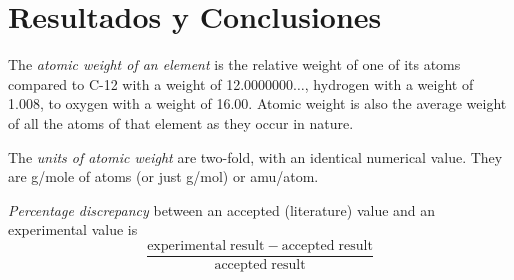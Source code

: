 \documentclass{article}
\begin{document}
\section{Resultados y Conclusiones}
\begin{enumerate}
\begin{item}
The \emph{atomic weight of an element} is the relative weight of one of its atoms compared to C-12 with a weight of 12.0000000$\ldots$, hydrogen with a weight of 1.008, to oxygen with a weight of 16.00. Atomic weight is also the average weight of all the atoms of that element as they occur in nature.
\end{item}
\begin{item}
The \emph{units of atomic weight} are two-fold, with an identical numerical value. They are g/mole of atoms (or just g/mol) or amu/atom.
\end{item}
\begin{item}
\emph{Percentage discrepancy} between an accepted (literature) value and an experimental value is
\begin{equation*}
\frac{\mathrm{experimental\;result} - \mathrm{accepted\;result}}{\mathrm{accepted\;result}}
\end{equation*}
\end{item}
\end{enumerate}


\end{document}
